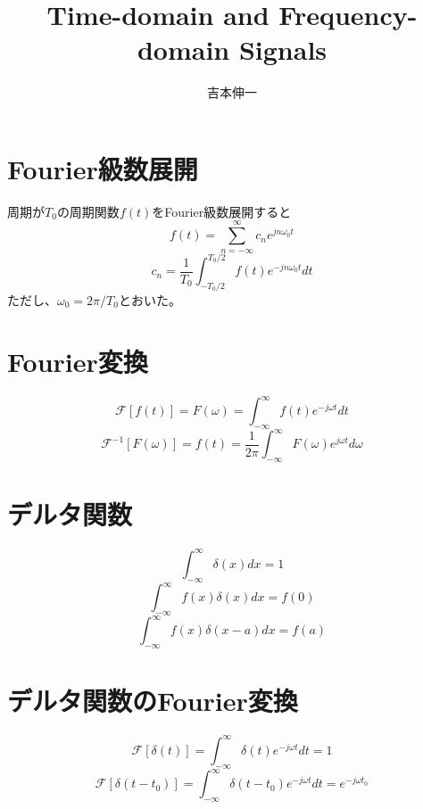 \documentclass[]{jlreq}
\begin{document}
\title{Time-domain and Frequency-domain Signals}
\author{吉本伸一}
\maketitle
\tableofcontents
\clearpage

\section{Fourier級数展開}
周期が$T_0$の周期関数$f(t)$をFourier級数展開すると
%
\begin{equation}
  f(t) = \sum_{n=-\infty}^{\infty} c_n e^{j n \omega_0 t}
\end{equation}
%
\begin{equation}
  c_n = \frac{1}{T_0} \int_{-T_0/2}^{T_0/2} f(t) e^{- j n \omega_0 t} dt
\end{equation}
%
ただし、$\omega_0 = 2\pi/T_0$とおいた。
%
\section{Fourier変換}
\begin{equation}
  \mathcal{F}[f(t)] = F(\omega) = \int_{-\infty}^{\infty} f(t) e^{-j\omega t} dt
\end{equation}
\begin{equation}
  \mathcal{F}^{-1}[F(\omega)] = f(t) = \frac{1}{2\pi}\int_{-\infty}^{\infty} F(\omega) e^{j\omega t} d\omega
\end{equation}

\section{デルタ関数}
\begin{equation}
  \int_{-\infty}^{\infty} \delta (x) dx = 1
\end{equation}
%
\begin{equation}
  \int_{-\infty}^{\infty} f(x) \delta (x) dx = f(0)
\end{equation}
%
\begin{equation}
  \int_{-\infty}^{\infty} f(x) \delta (x - a) dx = f(a)
\end{equation}
%
\section{デルタ関数のFourier変換}
%
\begin{equation}
  \mathcal{F}[\delta (t)] = \int_{-\infty}^{\infty} \delta (t) e^{- j \omega t} dt = 1 
\end{equation}
%
\begin{equation}
  \mathcal{F}[\delta (t - t_0)] = \int_{-\infty}^{\infty} \delta (t - t_0) e^{- j \omega t} dt = e^{-j \omega t_0}
  \label{fd2}
\end{equation}
%
\end{document}
